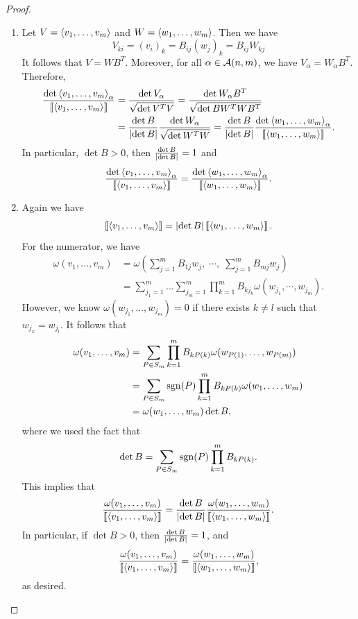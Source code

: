 \documentclass[a4paper]{article}
\begin{document}
\begin{proof}
\begin{enumerate}
\item Let $V = \left\langle v_1, \dots, v_m \right\rangle$ and $W = \left\langle w_1, \dots, 
w_m \right\rangle$. Then we have 
\[
V_{ki} = (v_i)_k = B_{ij} (w_j)_k = B_{ij} W_{kj}
\]
It follows that $V = W B^T$. Moreover, for all
$\alpha \in \mathcal{A}(n, m)$, we have $V_\alpha = W_\alpha B^T$.
Therefore, 
\[
\begin{aligned}
\frac{\det \left\langle v_1, \dots, v_m \right\rangle_\alpha}{\left\llbracket \left\langle v_1, 
\dots, v_m \right\rangle \right\rrbracket}
&= \frac{\det V_\alpha}{\sqrt{\det V^T V}} 
= \frac{\det W_\alpha B^T}{\sqrt{\det B W^T W B^T}} \\
&= \frac{\det B}{\left\lvert \det B\right\rvert} \frac{\det W_\alpha}{\sqrt
{\det W^T W}} 
= \frac{\det B}{\left\lvert \det B\right\rvert} \frac{\det \left\langle w_1, \dots, 
w_m \right\rangle_\alpha}{\left\llbracket \left\langle w_1, \dots, w_m \right\rangle \right\rrbracket}.
\end{aligned}
\]
In particular, $\det B > 0$, then $\frac{\det B}{\left\lvert \det B\right\rvert}
= 1$ and 
\[
\frac{\det \left\langle v_1, \dots, v_m \right\rangle_\alpha}{\left\llbracket \left\langle v_1, 
\dots, v_m \right\rangle \right\rrbracket}
= \frac{\det \left\langle w_1, \dots, 
w_m \right\rangle_\alpha}{\left\llbracket \left\langle w_1, \dots, w_m \right\rangle \right\rrbracket}.
\]

\item Again we have 
\[
\left\llbracket \left\langle v_1, \dots, v_m \right\rangle \right\rrbracket 
= \left\lvert \det B\right\rvert \left\llbracket \left\langle w_1, \dots, w_m \right\rangle \right\rrbracket.
\]
For the numerator, we have 
\[
\begin{aligned}
\omega(v_1, \dots, v_m) 
&= \omega \left( \sum_{j=1}^m B_{1j} w_j, \; \cdots, \; 
\sum_{j=1}^m B_{mj} w_j \right) \\
&= \sum_{j_1 = 1}^m \dots \sum_{j_m = 1}^m 
\prod_{k=1}^m B_{k j_k} \omega (w_{j_1}, \cdots, w_{j_m}).
\end{aligned}
\]
However, we know $\omega(w_{j_1}, \dots, w_{j_m}) = 0$
if there exists $k \neq l$ such that $w_{j_k} = w_{j_l}$.
It follows that 
\[
\begin{aligned}
\omega(v_1, \dots, v_m) 
&= \sum_{P \in S_m} \prod_{k=1}^m B_{k P(k)} 
\omega (w_{P(1)}, \dots, w_{P(m)}) \\
&= \sum_{P \in S_m} \operatorname{sgn}(P) \prod_{k=1}^m B_{k P(k)} 
\omega(w_1, \dots, w_m) \\
&= \omega(w_1, \dots, w_m) \det B,
\end{aligned}
\]
where we used the fact that 
\[
\det B = \sum_{P \in S_m} \operatorname{sgn}(P) 
\prod_{k=1}^m B_{k P(k)}.
\]
This implies that 
\[
\frac{\omega(v_1, \dots, v_m)}{\left\llbracket \left\langle v_1, \dots, 
v_m \right\rangle \right\rrbracket} = \frac{\det B}{\left\lvert \det B\right\rvert} 
\frac{\omega(w_1, \dots, w_m)}{\left\llbracket \left\langle w_1, 
\dots, w_m \right\rangle \right\rrbracket}.
\]
In particular, if $\det B > 0$, then 
$\frac{\det B}{\left\lvert \det B\right\rvert} = 1$, and 
\[
\frac{\omega(v_1, \dots, v_m)}{\left\llbracket \left\langle v_1, \dots, 
v_m \right\rangle \right\rrbracket} = \frac{\omega(w_1, \dots, w_m)}{\left\llbracket \left\langle w_1, 
\dots, w_m \right\rangle \right\rrbracket},
\]
as desired.
\end{enumerate}
\end{proof}
\end{document}
